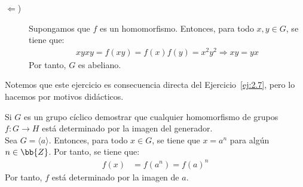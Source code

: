 \begin{ejercicio}
\begin{enumerate}
\begin{description}
            \item[$\Longleftarrow$)] Supongamos que $f$ es un homomorfismo. Entonces, para todo $x,y\in G$, se tiene que:
            \begin{align*}
                xyxy=f(xy)=f(x)f(y)=x^2y^2\Longrightarrow xy=yx
            \end{align*}
            Por tanto, $G$ es abeliano.
        \end{description}
    \end{enumerate}
    \begin{observacion}
        Notemos que este ejercicio es consecuencia directa del Ejercicio~\ref{ej:2.7}, pero lo hacemos por motivos didácticos.
    \end{observacion}
\end{ejercicio}


\begin{ejercicio}\label{ej:2.38}
    Si $G$ es un grupo cíclico demostrar que cualquier homomorfismo de grupos $f : G \to H$ está determinado por la imagen del generador.\\

    Sea $G=\langle a\rangle$. Entonces, para todo $x\in G$, se tiene que $x=a^n$ para algún $n\in \bb{Z}$. Por tanto, se tiene que:
    \begin{align*}
        f(x)&=f(a^n)=f(a)^n
    \end{align*}
    Por tanto, $f$ está determinado por la imagen de $a$.
\end{ejercicio}

